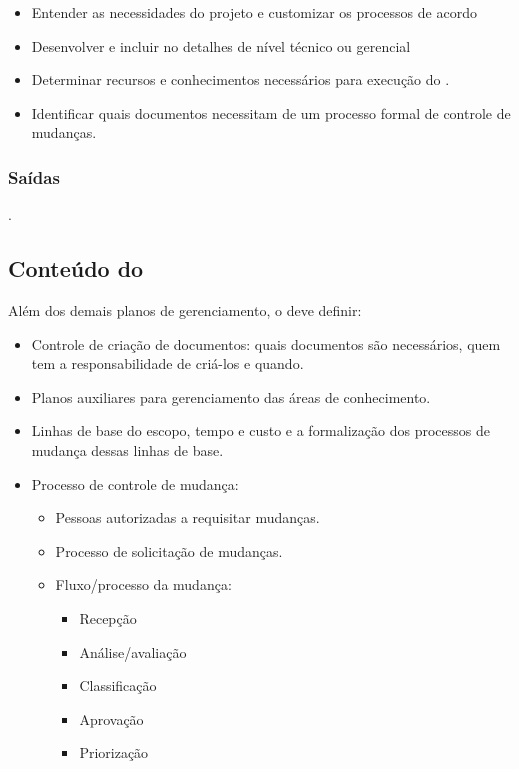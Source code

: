 \begin{itemize}

\item Entender as necessidades do projeto e customizar os processos de acordo

\item Desenvolver e incluir no \planproj detalhes de nível técnico ou gerencial

\item Determinar recursos e conhecimentos necessários para execução do \planproj.

\item Identificar quais documentos necessitam de um processo formal de controle de mudanças.

\end{itemize}

\subsubsection{Saídas}

\planproj.

\subsection{Conteúdo do \planproj}

Além dos demais planos de gerenciamento, o \planproj deve definir:

\begin{itemize}

\item Controle de criação de documentos: quais documentos são necessários, quem tem a responsabilidade de criá-los e quando.

\item Planos auxiliares para gerenciamento das áreas de conhecimento.

\item Linhas de base do escopo, tempo e custo e a formalização dos processos de mudança dessas linhas de base.

\item Processo de controle de mudança:

	\begin{itemize}

	\item Pessoas autorizadas a requisitar mudanças.

	\item Processo de solicitação de mudanças.

	\item Fluxo/processo da mudança:

		\begin{itemize}

		\item Recepção
		\item Análise/avaliação
		\item Classificação
		\item Aprovação
		\item Priorização

		\end{itemize}

\end{itemize}

\end{itemize}

